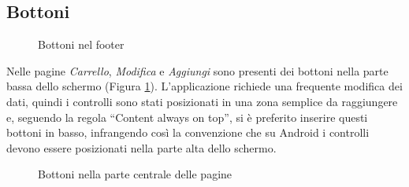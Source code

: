 \documentclass[12pt, a4paper, titlepage]{report}
\begin{document}
	\subsection{Bottoni} \label{butt}
	
	\begin{figure}[H] 
		\centering
		\hspace*{2cm}
		\caption{Bottoni nel footer}
		\label{fig:buttons}
	\end{figure}
	Nelle pagine \textit{Carrello}, \textit{Modifica} e \textit{Aggiungi} sono presenti dei bottoni nella parte bassa dello schermo (Figura \ref{fig:buttons}). L'applicazione richiede una frequente modifica dei dati, quindi i controlli sono stati posizionati in una zona semplice da raggiungere e, seguendo la regola ``Content always on top'', si è preferito inserire questi bottoni in basso, infrangendo così la convenzione che su Android i controlli devono essere posizionati nella parte alta dello schermo. 
	\begin{figure}[H] 
		\centering
		\hspace*{1cm}
		\hspace*{1cm}
		\caption{Bottoni nella parte centrale delle pagine}
		\label{fig:item-buttons}
	\end{figure}
\end{document}
